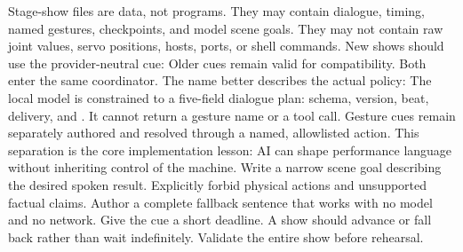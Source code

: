 {}Stage-show files are data, not programs. They may contain dialogue, timing,\markdownRendererSoftLineBreak
{}named gestures, checkpoints, and model scene goals. They may not contain raw\markdownRendererSoftLineBreak
{}joint values, servo positions, hosts, ports, or shell commands.\markdownRendererParagraphSeparator
{}New shows should use the provider-neutral  cue:\markdownRendererInterblockSeparator
{}\markdownRendererInterblockSeparator
{}Older  cues remain valid for compatibility. Both enter the same\markdownRendererSoftLineBreak
{}coordinator. The name  better describes the actual policy:\markdownRendererInterblockSeparator
{}\markdownRendererInterblockSeparator
{}The local model is constrained to a five-field dialogue plan: schema, version,\markdownRendererSoftLineBreak
{}beat, delivery, and . It cannot return a gesture name or a tool\markdownRendererSoftLineBreak
{}call. Gesture cues remain separately authored and resolved through a named,\markdownRendererSoftLineBreak
{}allowlisted action. This separation is the core implementation lesson: AI can\markdownRendererSoftLineBreak
{}shape performance language without inheriting control of the machine.\markdownRendererInterblockSeparator
{}\markdownRendererSectionBegin
{}\markdownRendererInterblockSeparator
{}\markdownRendererOlBegin
{}Write a narrow scene goal describing the desired spoken result.\markdownRendererOlItemEnd 
{}Explicitly forbid physical actions and unsupported factual claims.\markdownRendererOlItemEnd 
{}Author a complete fallback sentence that works with no model and no network.\markdownRendererOlItemEnd 
{}Give the cue a short deadline. A show should advance or fall back rather\markdownRendererSoftLineBreak
{}than wait indefinitely.\markdownRendererOlItemEnd 
{}Validate the entire show before rehearsal.\markdownRendererOlItemEnd 
